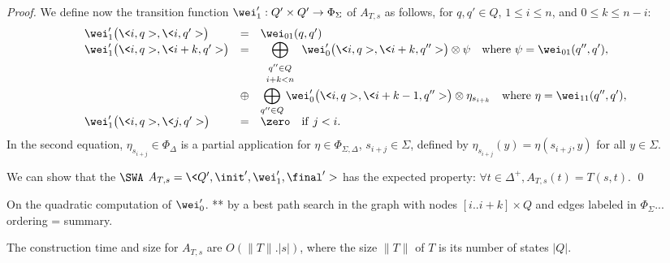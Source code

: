 \begin{proof}
\noindent
We define now the transition function 
$\wei'_1: Q' \times Q' \to \Phi_\Sigma$
of $A_{T, s}$ as follows,
for $q, q' \in Q$,
$1 \leq i \leq n$, and $0 \leq k \leq n-i$:
\[
\begin{array}{lcl}
\wei'_1\bigl(\< i, q>, \< i, q'>\bigr) & = & \wei_{01}(q, q')\\
%
\wei'_1\bigl(\< i, q>, \< i+k, q'>\bigr) & = & 
\displaystyle
\bigoplus_{\begin{array}{c}
           \scriptstyle q'' \in Q\\[-2pt]
           \scriptstyle i+k < n
           \end{array}} 
\wei'_0\bigl(\<i, q>, \< i+k, q''>\bigr) \otimes \psi %
\quad \mathrm{where~} \psi = \wei_{01}(q'', q'),\\
 & \oplus & \displaystyle
\bigoplus_{q'' \in Q} \wei'_0\bigl(\<i, q>, \< i+k-1, q''>\bigr) \otimes \eta_{s_{i+k}}
\quad \mathrm{where~}\eta = \wei_{11}(q'', q'),\\
%
\wei'_1\bigl(\< i, q>, \< j, q'>\bigr) & = & \zero  
\quad \mathrm{if~} j < i.
\end{array}      
\]
%
In the second equation, 
$\eta_{s_{i+j}} \in \Phi_{\Delta}$ is a partial application 
for $\eta \in \Phi_{\Sigma, \Delta}$, $s_{i+j} \in \Sigma$, 
defined by $\eta_{s_{i+j}}(y) = \eta(s_{i+j}, y)$ for all $y \in \Sigma$.

\noindent
We can show that the $\SWA$ $A_{T, s} = \< Q', \init', \wei'_1, \final' >$
has the expected property: $\forall t \in \Delta^+, A_{T, s}(t) = T(s, t)$.
\qed
\end{proof}

\noindent
On the quadratic computation of $\wei'_0$. **
by a best path search in the graph with nodes $[i..i+k] \times Q$
and edges labeled in $\Phi_\Sigma$...
ordering = summary.


\noindent
The construction time and size for $A_{T, s}$ are $O(\| T \| . | s |)$,
where the size $\| T \|$ of $T$ is its number of states $|Q|$.


